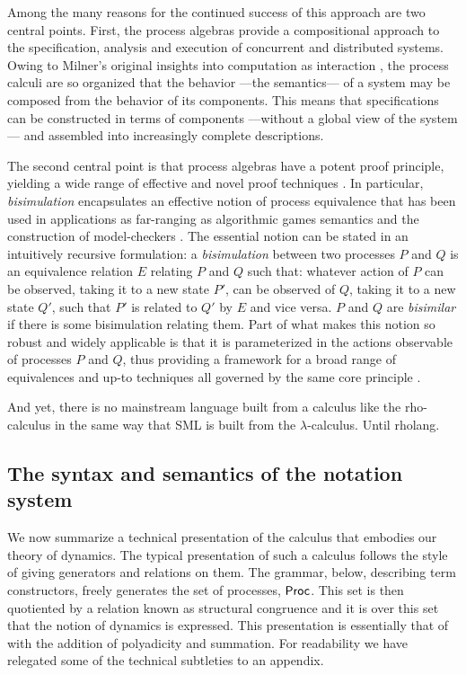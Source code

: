 Among the many reasons for the continued success of this approach are
two central points. First, the process algebras provide a
compositional approach to the specification, analysis and execution of
concurrent and distributed systems. Owing to Milner's original
insights into computation as interaction \cite{DBLP:journals/cacm/Milner93}, the process
calculi are so organized that the behavior ---the semantics--- of a
system may be composed from the behavior of its components. This means that specifications can be constructed in
terms of components ---without a global view of the system--- and
assembled into increasingly complete descriptions.

The second central point is that process algebras have a potent proof
principle, yielding a wide range of effective and novel proof
techniques \cite{DBLP:conf/concur/SangiorgiM92} \cite{DBLP:conf/fmco/Sangiorgi05} \cite{DBLP:journals/toplas/Sangiorgi09}. In particular, \emph{bisimulation} encapsulates an effective
notion of process equivalence that has been used in applications as
far-ranging as algorithmic games semantics
\cite{DBLP:conf/sas/Abramsky05} and the construction of
model-checkers \cite{caires_2004}. The essential notion can be stated in
an intuitively recursive formulation: a \emph{bisimulation} between two
processes $P$ and $Q$ is an equivalence relation $E$ relating $P$
and $Q$ such that: whatever action of $P$ can be observed, taking it
to a new state $P'$, can be observed of $Q$, taking it to a new state
$Q'$, such that $P'$ is related to $Q'$ by $E$ and vice versa. $P$ and
$Q$ are \emph{bisimilar} if there is some bisimulation relating
them. Part of what makes this notion so robust and widely applicable
is that it is parameterized in the actions observable of processes
$P$ and $Q$, thus providing a framework for a broad range of
equivalences and up-to techniques \cite{DBLP:conf/concur/SangiorgiM92} all governed by the same core
principle \cite{DBLP:journals/toplas/Sangiorgi09}.

And yet, there is no mainstream language built from a calculus like
the rho-calculus in the same way that SML is built from the
$\lambda$-calculus. Until rholang.

\subsection{The syntax and semantics of the notation system}\label{sub:the_syntax_and_semantics_of_the_notation_system} %

We now summarize a technical presentation of the calculus that
embodies our theory of dynamics. The typical presentation of such a
calculus follows the style of giving generators and relations on
them. The grammar, below, describing term constructors, freely
generates the set of processes, $\mathsf{Proc}$. This set is then quotiented
by a relation known as structural congruence and it is over this set
that the notion of dynamics is expressed. This presentation is
essentially that of \cite{DBLP:journals/entcs/MeredithR05} with the addition of
polyadicity and summation. For readability we have relegated some of
the technical subtleties to an appendix.

